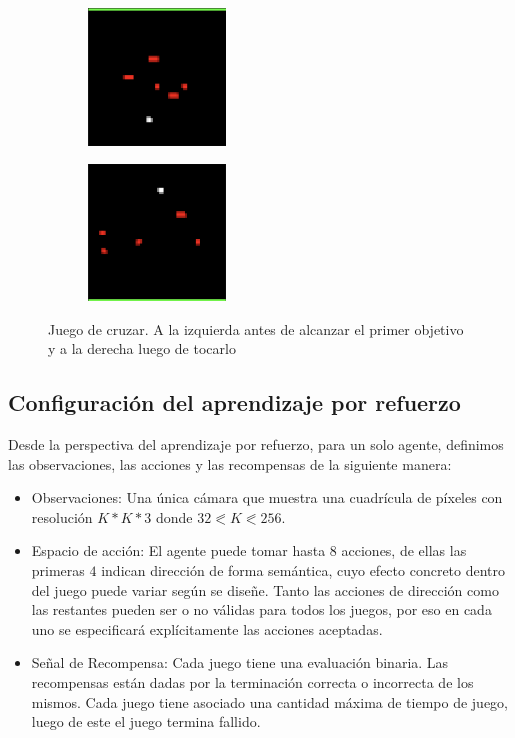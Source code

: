 \begin{figure}[ht!]
    \centering
    \begin{subfigure}
      \centering
      \includegraphics[width=0.4\textwidth]{Graphics/uthopia_street_1.png}
      \label{fig:uthopia_street_1}
    \end{subfigure}%
    \begin{subfigure}
      \centering
      \includegraphics[width=0.4\textwidth]{Graphics/uthopia_street_2.png}
      \label{fig:uthopia_street_2}
    \end{subfigure}%
    \caption{Juego de cruzar. A la izquierda antes de alcanzar el primer objetivo y a la derecha luego de tocarlo}
    \label{fig:uthopia_street}
\end{figure}

\subsection{Configuración del aprendizaje por refuerzo}

Desde la perspectiva del aprendizaje por refuerzo, para un solo agente, definimos las observaciones, las acciones y las recompensas de la siguiente manera:

\begin{itemize}
    \item Observaciones: Una única cámara que muestra una cuadrícula de píxeles con resolución $K * K * 3$ donde $32 \eqslantless K \eqslantless 256$.
    \item Espacio de acción: El agente puede tomar hasta $8$ acciones, de ellas las primeras $4$ indican dirección de forma semántica, cuyo efecto concreto dentro del juego puede variar según se diseñe. Tanto las acciones de dirección como las restantes pueden ser o no válidas para todos los juegos, por eso en cada uno se especificará explícitamente las acciones aceptadas.
    \item Señal de Recompensa: Cada juego tiene una evaluación binaria. Las recompensas están dadas por la terminación correcta o incorrecta de los mismos. Cada juego tiene asociado una cantidad máxima de tiempo de juego, luego de este el juego termina fallido.
\end{itemize} 

